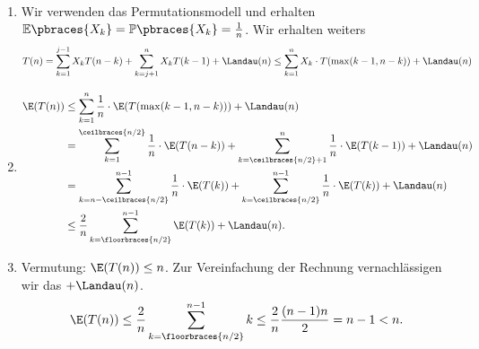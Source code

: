 \begin{solution}

\phantom{}

\begin{enumerate}[label = \alph*)]
  \item Wir verwenden das Permutationsmodell und erhalten $\mathbb{E}\pbraces{X_k} = \mathbb{P}\pbraces{X_k} = \frac{1}{n}$. Wir erhalten weiters
  \begin{align*}
  	T(n) = \sum_{k = 1}^{j - 1} X_k T(n - k) + \sum_{k = j + 1}^{n} X_k T(k - 1) + \Landau(n) \leq \sum_{k=1}^n X_k \cdot T(\max(k-1,n-k)) + \Landau(n)
  \end{align*}
  \item
  \begin{align*}
    \E(T(n)) &\leq \sum_{k=1}^n \frac{1}{n} \cdot \E(T(\max(k-1,n-k))) + \Landau(n) \\
    &= \sum_{k=1}^{\ceilbraces{n/2}} \frac{1}{n} \cdot \E(T(n-k))
    + \sum_{k=\ceilbraces{n/2} + 1}^{n} \frac{1}{n} \cdot \E(T(k-1)) + \Landau(n) \\
    &= \sum_{k=n - \ceilbraces{n/2}}^{n - 1} \frac{1}{n} \cdot \E(T(k))
    + \sum_{k=\ceilbraces{n/2} }^{n - 1} \frac{1}{n} \cdot \E(T(k)) + \Landau(n) \\
    &\leq \frac{2}{n}\sum_{k=\floorbraces{n/2} }^{n - 1} \E(T(k)) + \Landau(n).
  \end{align*}
  \item Vermutung: $\E(T(n)) \leq n$. Zur Vereinfachung der Rechnung vernachlässigen wir
  das $+ \Landau(n)$.
  \begin{align*}
    \E(T(n)) \leq \frac{2}{n}\sum_{k=\floorbraces{n/2} }^{n - 1} k \leq \frac{2}{n}\frac{(n-1)n}{2}
    = n - 1 < n.
  \end{align*}
\end{enumerate}

\end{solution}
